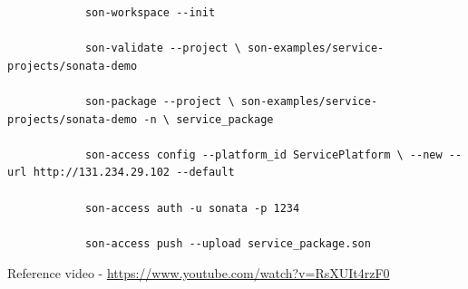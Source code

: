\begin{itemize}
\begin{itemize}
\begin{lstlisting}
			son-workspace --init
			
			son-validate --project \ son-examples/service-projects/sonata-demo
			
			son-package --project \ son-examples/service-projects/sonata-demo -n \ service_package
			
			son-access config --platform_id ServicePlatform \ --new --url http://131.234.29.102 --default 
			
			son-access auth -u sonata -p 1234
			
			son-access push --upload service_package.son
			\end{lstlisting}
			Reference video - \hyperlink{name}{https://www.youtube.com/watch?v=RsXUIt4rzF0}
		\end{itemize}
		
	\end{itemize}
	
	
